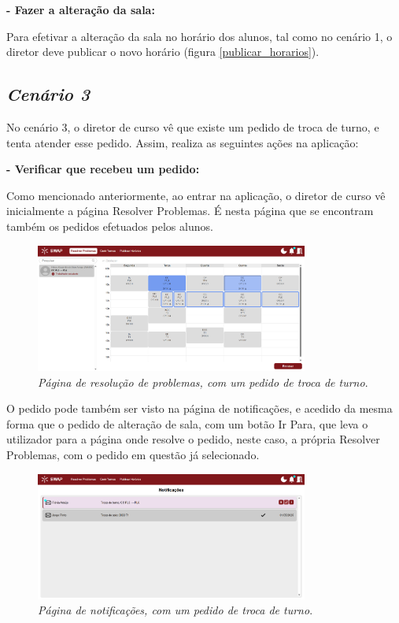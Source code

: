 \documentclass[12pt, a4paper]{article}
\begin{document}
\textbf{- Fazer a alteração da sala:}

Para efetivar a alteração da sala no horário dos alunos, tal como no cenário 1,
o diretor deve publicar o novo horário (figura \ref{publicar_horarios}).

\subsection{\emph{Cenário 3}}

No cenário 3, o diretor de curso vê que existe um pedido de troca de turno,
e tenta atender esse pedido. Assim, realiza as seguintes ações na aplicação:

\textbf{- Verificar que recebeu um pedido:}

Como mencionado anteriormente, ao entrar na aplicação, o diretor de curso vê inicialmente a página
Resolver Problemas. É nesta página que se encontram também os pedidos efetuados pelos alunos.

\begin{figure}[H]
    \centering
    \includegraphics[width=0.8\textwidth]{res/manual/resolver_troca_turno.png}
    \caption{\emph{Página de resolução de problemas, com um pedido de troca de turno}.}
    \label{resolver_troca_turno}
\end{figure}

O pedido pode também ser visto na página de notificações, e acedido da mesma forma que o pedido
de alteração de sala, com um botão Ir Para, que leva o utilizador para a página onde resolve o
pedido, neste caso, a própria Resolver Problemas, com o pedido em questão já selecionado.

\begin{figure}[H]
    \centering
    \includegraphics[width=0.8\textwidth]{res/manual/notificacao_troca_turno.png}
    \caption{\emph{Página de notificações, com um pedido de troca de turno}.}
    \label{notificacao_troca_turno}
\end{figure}
\end{document}
